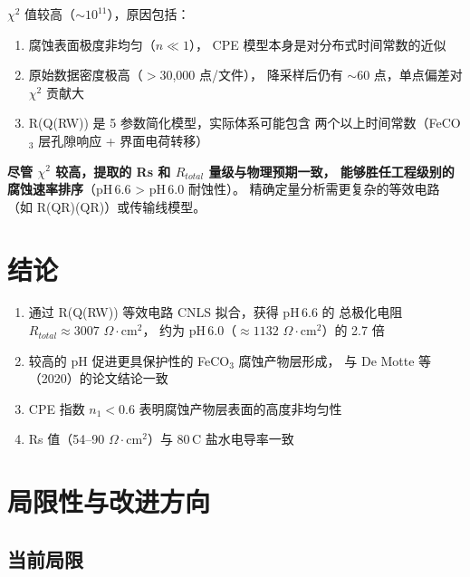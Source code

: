 \documentclass[12pt,a4paper]{ctexart}
\begin{document}
$\chi^2$ 值较高（$\sim 10^{11}$），原因包括：

\begin{enumerate}[leftmargin=1.5cm]
  \item 腐蚀表面极度非均匀（$n \ll 1$），
  CPE 模型本身是对分布式时间常数的近似
  \item 原始数据密度极高（$>$30,000 点/文件），
  降采样后仍有 $\sim$60 点，单点偏差对 $\chi^2$ 贡献大
  \item R(Q(RW)) 是 5 参数简化模型，实际体系可能包含
  两个以上时间常数（FeCO$_3$ 层孔隙响应 + 界面电荷转移）
\end{enumerate}

\textbf{尽管 $\chi^2$ 较高，提取的 Rs 和 $R_{total}$ 量级与物理预期一致，
能够胜任工程级别的腐蚀速率排序}（pH\,6.6 > pH\,6.0 耐蚀性）。
精确定量分析需更复杂的等效电路（如 R(QR)(QR)）或传输线模型。

\newpage

\section{结论}

\begin{enumerate}[leftmargin=1.5cm]
  \item 通过 R(Q(RW)) 等效电路 CNLS 拟合，获得 pH\,6.6 的
  总极化电阻 $R_{total} \approx 3007$ $\Omega\!\cdot\!$cm$^2$，
  约为 pH\,6.0（$\approx 1132$ $\Omega\!\cdot\!$cm$^2$）的 2.7 倍
  \item 较高的 pH 促进更具保护性的 FeCO$_3$ 腐蚀产物层形成，
  与 De Motte 等（2020）的论文结论一致
  \item CPE 指数 $n_1 < 0.6$ 表明腐蚀产物层表面的高度非均匀性
  \item Rs 值（54--90 $\Omega\!\cdot\!$cm$^2$）与 80\,\textdegree C 盐水电导率一致
\end{enumerate}

\newpage

\section{局限性与改进方向}

\subsection{当前局限}
\end{document}
